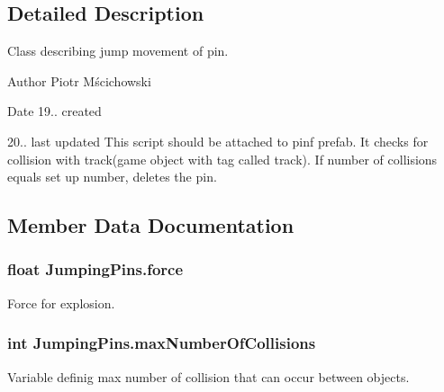 \subsection{Detailed Description}
Class describing jump movement of pin. 

\begin{DoxyAuthor}{Author}
Piotr Mścichowski 
\end{DoxyAuthor}
\begin{DoxyDate}{Date}
19.. created 

20.. last updated This script should be attached to pinf prefab. It checks for collision with track(game object with tag called \textquotesingle{}track\textquotesingle{}). If number of collisions equals set up number, deletes the pin. 
\end{DoxyDate}


\subsection{Member Data Documentation}
\hypertarget{class_jumping_pins_af7d195dc1a8351eb4a6f08bd77032e74}{}
\subsubsection[{force}]{\setlength{\rightskip}{0pt plus 5cm}float Jumping\+Pins.\+force}\label{class_jumping_pins_af7d195dc1a8351eb4a6f08bd77032e74}


Force for explosion. 

\hypertarget{class_jumping_pins_a31a3fe87e85993182f3ed08538bf85cf}{}
\subsubsection[{max\+Number\+Of\+Collisions}]{\setlength{\rightskip}{0pt plus 5cm}int Jumping\+Pins.\+max\+Number\+Of\+Collisions}\label{class_jumping_pins_a31a3fe87e85993182f3ed08538bf85cf}


Variable definig max number of collision that can occur between objects. 

\hypertarget{class_jumping_pins_ae0c8d6f8c73c3efbdaf4e6fbf9a9299d}{}
